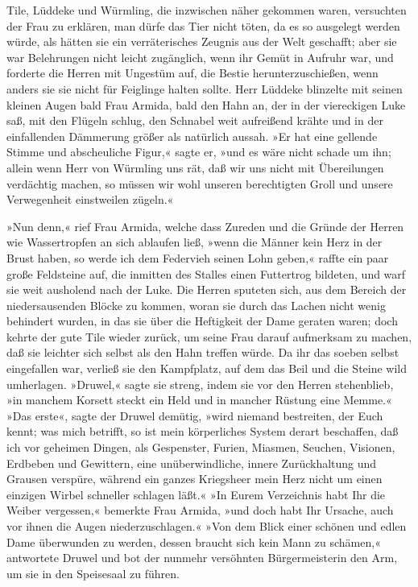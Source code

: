 Tile, Lüddeke und Würmling, die inzwischen näher gekommen waren,
versuchten der Frau zu erklären, man dürfe das Tier nicht töten, da
es so ausgelegt werden würde, als hätten sie ein verräterisches
Zeugnis aus der Welt geschafft; aber sie war Belehrungen nicht
leicht zugänglich, wenn ihr Gemüt in Aufruhr war, und forderte die
Herren mit Ungestüm auf, die Bestie herunterzuschießen, wenn anders
sie sie nicht für Feiglinge halten sollte. Herr Lüddeke blinzelte
mit seinen kleinen Augen bald Frau Armida, bald den Hahn an, der in
der viereckigen Luke saß, mit den Flügeln schlug, den Schnabel weit
aufreißend krähte und in der einfallenden Dämmerung größer als
natürlich aussah. »Er hat eine gellende Stimme und abscheuliche
Figur,« sagte er, »und es wäre nicht schade um ihn; allein wenn
Herr von Würmling uns rät, daß wir uns nicht mit \pagenum{[18]}
Übereilungen verdächtig machen, so müssen wir wohl unseren
berechtigten Groll und unsere Verwegenheit einstweilen zügeln.«

»Nun denn,« rief Frau Armida, welche dass Zureden und die Gründe
der Herren wie Wassertropfen an sich ablaufen ließ, »wenn die
Männer kein Herz in der Brust haben, so werde ich dem Federvieh
seinen Lohn geben,« raffte ein paar große Feldsteine auf, die
inmitten des Stalles einen Futtertrog bildeten, und warf sie weit
ausholend nach der Luke. Die Herren sputeten sich, aus dem Bereich
der niedersausenden Blöcke zu kommen, woran sie durch das Lachen
nicht wenig behindert wurden, in das sie über die Heftigkeit der
Dame geraten waren; doch kehrte der gute Tile wieder zurück, um
seine Frau darauf aufmerksam zu machen, daß sie leichter sich
selbst als den Hahn treffen würde. Da ihr das soeben selbst
eingefallen war, verließ sie den Kampfplatz, auf dem das Beil und
die Steine wild umherlagen. »Druwel,« sagte sie streng, indem sie
vor den Herren stehenblieb, »in manchem Korsett steckt ein Held und
in mancher Rüstung eine Memme.« »Das erste«, sagte der Druwel
demütig, »wird niemand bestreiten, der Euch kennt; was mich
betrifft, so ist mein körperliches System derart beschaffen, daß
ich vor geheimen Dingen, als Gespenster, Furien, Miasmen, Seuchen,
Visionen, Erdbeben und Gewittern, eine unüberwindliche, innere
Zurückhaltung und Grausen verspüre, während ein ganzes Kriegsheer
mein Herz nicht um einen einzigen Wirbel schneller schlagen läßt.«
»In Eurem Verzeichnis habt Ihr die Weiber vergessen,« bemerkte Frau
Armida, »und doch habt Ihr Ursache, auch vor ihnen die Augen
niederzuschlagen.« »Von dem Blick einer schönen und edlen Dame
überwunden zu werden, \pagenum{[19]} dessen braucht sich kein Mann
zu schämen,« antwortete Druwel und bot der nunmehr versöhnten
Bürgermeisterin den Arm, um sie in den Speisesaal zu führen.

